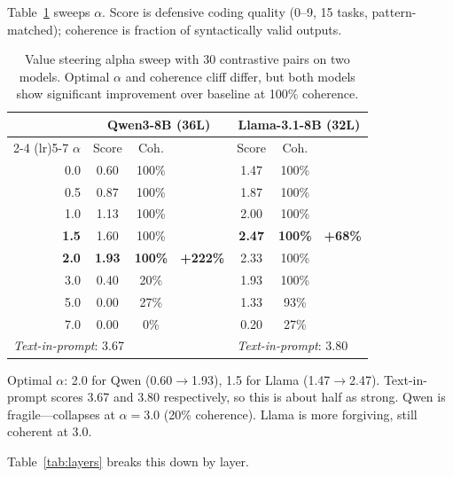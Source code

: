 \documentclass{article}
\begin{document}
Table~\ref{tab:alpha} sweeps $\alpha$. Score is defensive coding quality (0--9, 15 tasks, pattern-matched); coherence is fraction of syntactically valid outputs.

\begin{table}[t]
\centering
\caption{Value steering alpha sweep with 30 contrastive pairs on two models. Optimal $\alpha$ and coherence cliff differ, but both models show significant improvement over baseline at 100\% coherence.}
\label{tab:alpha}
\begin{tabular}{rcccccc}
\toprule
 & \multicolumn{3}{c}{\textbf{Qwen3-8B} (36L)} & \multicolumn{3}{c}{\textbf{Llama-3.1-8B} (32L)} \\
\cmidrule(lr){2-4} \cmidrule(lr){5-7}
$\alpha$ & Score & Coh. & & Score & Coh. & \\
\midrule
0.0 & 0.60 & 100\% & & 1.47 & 100\% & \\
0.5 & 0.87 & 100\% & & 1.87 & 100\% & \\
1.0 & 1.13 & 100\% & & 2.00 & 100\% & \\
\textbf{1.5} & 1.60 & 100\% & & \textbf{2.47} & \textbf{100\%} & \textbf{+68\%} \\
\textbf{2.0} & \textbf{1.93} & \textbf{100\%} & \textbf{+222\%} & 2.33 & 100\% & \\
3.0 & 0.40 & 20\% & & 1.93 & 100\% & \\
5.0 & 0.00 & 27\% & & 1.33 & 93\% & \\
7.0 & 0.00 & 0\% & & 0.20 & 27\% & \\
\midrule
\multicolumn{4}{l}{\textit{Text-in-prompt}: 3.67} & \multicolumn{3}{l}{\textit{Text-in-prompt}: 3.80} \\
\bottomrule
\end{tabular}
\end{table}

Optimal $\alpha$: 2.0 for Qwen (0.60$\to$1.93), 1.5 for Llama (1.47$\to$2.47). Text-in-prompt scores 3.67 and 3.80 respectively, so this is about half as strong. Qwen is fragile---collapses at $\alpha{=}3.0$ (20\% coherence). Llama is more forgiving, still coherent at 3.0.

Table~\ref{tab:layers} breaks this down by layer.
\end{document}
